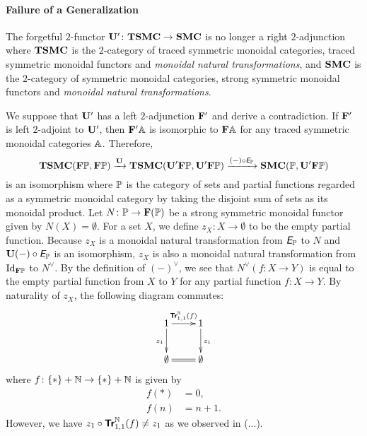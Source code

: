 \paragraph{Failure of a Generalization}

The forgetful \(2\)-functor \(\mathbf{U}' \colon \mathbf{TSMC} \to \mathbf{SMC}\) is no longer
a right \(2\)-adjunction where \(\mathbf{TSMC}\) is the \(2\)-category of traced
symmetric monoidal categories, traced symmetric monoidal functors and
\emph{monoidal natural transformations}, and \(\mathbf{SMC}\) is the
\(2\)-category of symmetric monoidal categories, strong symmetric
monoidal functors and \emph{monoidal natural transformations}.

We suppose that \(\mathbf{U}'\) has a left \(2\)-adjunction \(\mathbf{F}'\) and derive
a contradiction. If \(\mathbf{F}'\) is left \(2\)-adjoint to \(\mathbf{U}'\), then
\(\mathbf{F}'\mathbb{A}\) is isomorphic to \(\mathbf{F}\mathbb{A}\) for any traced
symmetric monoidal categories \(\mathbb{A}\). Therefore,
\begin{equation*}
  \mathbf{TSMC}(\mathbf{F}\mathbb{P},\mathbf{F}\mathbb{P}) \xrightarrow{\mathbf{U}}
  \mathbf{TSMC}(\mathbf{U}'\mathbf{F}\mathbb{P},\mathbf{U}'\mathbf{F}\mathbb{P}) \xrightarrow{(-) \circ \textit{\textsf{E}}_{\mathbb{\mathbb{P}}}}
  \mathbf{SMC}(\mathbb{P},\mathbf{U}'\mathbf{F}\mathbb{P})
\end{equation*}
is an isomorphism where \(\mathbb{P}\) is the category of sets and partial
functions regarded as a symmetric monoidal category by taking the
disjoint sum of sets as its monoidal product. Let \(N \colon \mathbb{P} \to
\mathbf{F}(\mathbb{P})\) be a strong symmetric monoidal functor given by \(N(X) =
\emptyset\). For a set \(X\), we define \(z_{X} \colon X \to
\emptyset\) to be the empty partial function. Because \(z_{X}\) is a
monoidal natural transformation from \(\textit{\textsf{E}}_{\mathbb{\mathbb{P}}}\) to \(N\) and
\(\mathbf{U}(-) \circ \textit{\textsf{E}}_{\mathbb{\mathbb{P}}}\) is an isomorphism, \(z_{X}\) is also a
monoidal natural transformation from \(\mbox{Id}_{\mathbf{F}\mathbb{P}}\) to \(N^{\vee}\).
By the definition of \((-)^{\vee}\), we see that \(N^{\vee}(f \colon X
\to Y)\) is equal to the empty partial function from \(X\) to \(Y\)
for any partial function \(f \colon X \to Y\). By naturality of
\(z_{X}\), the following diagram commutes:
\begin{equation*}
  \xymatrix{
    1 \ar[r]^{\Tr{\NN}_{1,1}(f)} \ar[d]_{z_{1}} &
    1 \ar[d]^{z_{1}} \\
    \emptyset \ar@{=}[r] &
    \emptyset
  }
\end{equation*}
where \(f \colon \{\ast\} + \mathbb N \to \{\ast\} + \mathbb N\) is given by
\begin{align*}
  f(\ast) &= 0, \\
  f(n) &= n+1.
\end{align*}
However, we have \(z_{1} \circ {\normalfont\textsf{\textbf{Tr}}}^{\mathbb N}_{1,1}(f) \neq z_{1}\) as we observed in (...).
